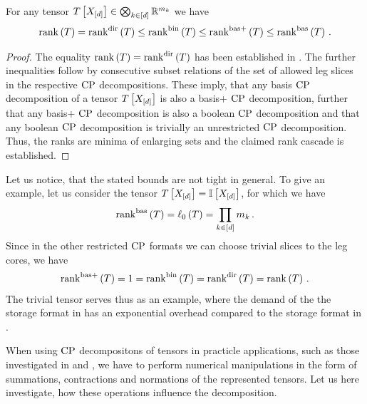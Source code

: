 \begin{theorem}
    \label{the:sliceToCP}
    For any tensor $ T\left[X_{[d]}\right]\in\bigotimes_{k\in[d]} \mathbb{R}^{m_{k}}$ we have
    \begin{align*}
        \mathrm{rank}\left(T\right) = \mathrm{rank}^{\mathrm{dir}}\left(T\right) \leq \mathrm{rank}^{\mathrm{bin}}\left(T\right) \leq \mathrm{rank}^{\mathrm{bas+}}\left(T\right) \leq \mathrm{rank}^{\mathrm{bas}}\left(T\right) \, .
    \end{align*}
\end{theorem}
\begin{proof}
    The equality $\mathrm{rank}\left(T\right) = \mathrm{rank}^{\mathrm{dir}}\left(T\right)$ has been established in .
    The further inequalities follow by consecutive subset relations of the set of allowed leg slices in the respective $\mathrm{CP}$ decompositions.
    These imply, that any basis $\mathrm{CP}$ decomposition of a tensor $T\left[X_{[d]}\right]$ is also a basis+ $\mathrm{CP}$ decomposition, further that any basis+ $\mathrm{CP}$ decomposition is also a boolean $\mathrm{CP}$ decomposition and that any boolean $\mathrm{CP}$ decomposition is trivially an unrestricted $\mathrm{CP}$ decomposition.
    Thus, the ranks are minima of enlarging sets and the claimed rank cascade is established.
\end{proof}

Let us notice, that the stated bounds are not tight in general.
To give an example, let us consider the tensor $T\left[X_{[d]}\right]=\mathbb{I}\left[X_{[d]}\right]$, for which we have
\begin{align*}
    \mathrm{rank}^{\mathrm{bas}}\left(T\right) = \ell_0\left(T\right) = \prod_{k\in[d]}m_{k} \, .
\end{align*}
Since in the other restricted $\mathrm{CP}$ formats we can choose trivial slices to the leg cores, we have
\begin{align*}
    \mathrm{rank}^{\mathrm{bas+}}\left(T\right) = 1 = \mathrm{rank}^{\mathrm{bin}}\left(T\right) = \mathrm{rank}^{\mathrm{dir}}\left(T\right) = \mathrm{rank}\left(T\right) \, .
\end{align*}
The trivial tensor serves thus as an example, where the demand of the the storage format in  has an exponential overhead compared to the storage format in .



When using $\mathrm{CP}$ decompositons of tensors in practicle applications, such as those investigated in  and , we have to perform numerical manipulations in the form of summations, contractions and normations of the represented tensors.
Let us here investigate, how these operations influence the decomposition.

